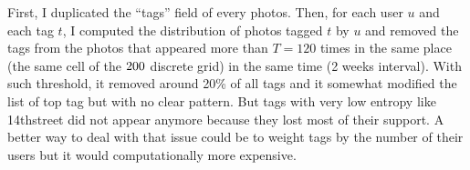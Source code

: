 First, I duplicated the \enquote{tags} field of every photos. Then, for each
user $u$ and each tag $t$, I computed the distribution of photos tagged $t$ by
$u$ and removed the tags from the photos that appeared more than $T=120$ times
in the same place (the same cell of the $200\time 200$ discrete grid) in the same
time (2 weeks interval). With such threshold, it removed around 20\% of all
tags and it somewhat modified the list of top tag but with no clear pattern.
But tags with very low entropy like \textsf{14thstreet} did not appear
anymore because they lost most of their support. A better way to deal with
that issue could be to weight tags by the number of their users but it would
computationally more expensive.
